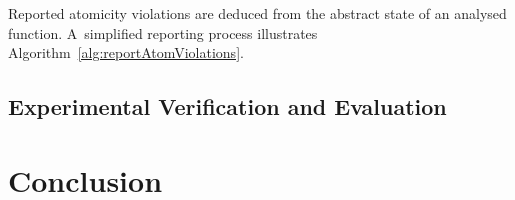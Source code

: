 Reported atomicity violations are deduced from the abstract state of
an analysed function. A~simplified reporting process illustrates
Algorithm~\ref{alg:reportAtomViolations}.

\begin{algorithm}[hbt]



    \caption{%
        Reporting of atomicity violations from the abstract state of
        an analysed function
    }
    \label{alg:reportAtomViolations}
\end{algorithm}


\section{Experimental Verification and Evaluation}
\label{sec:exp}




\chapter{Conclusion}
\label{chap:conc}



